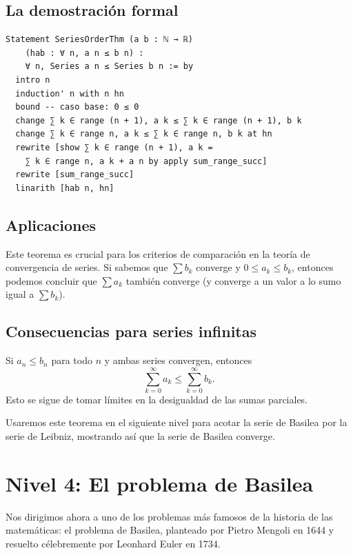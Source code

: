 \subsection{La demostración formal}

\begin{verbatim}
Statement SeriesOrderThm (a b : ℕ → ℝ)
    (hab : ∀ n, a n ≤ b n) :
    ∀ n, Series a n ≤ Series b n := by
  intro n
  induction' n with n hn
  bound -- caso base: 0 ≤ 0
  change ∑ k ∈ range (n + 1), a k ≤ ∑ k ∈ range (n + 1), b k
  change ∑ k ∈ range n, a k ≤ ∑ k ∈ range n, b k at hn
  rewrite [show ∑ k ∈ range (n + 1), a k =
    ∑ k ∈ range n, a k + a n by apply sum_range_succ]
  rewrite [sum_range_succ]
  linarith [hab n, hn]
\end{verbatim}

\subsection{Aplicaciones}

Este teorema es crucial para los criterios de comparación en la teoría de convergencia de series. Si sabemos que $\sum b_k$ converge y $0 \le a_k \le b_k$, entonces podemos concluir que $\sum a_k$ también converge (y converge a un valor a lo sumo igual a $\sum b_k$).

\subsection{Consecuencias para series infinitas}

Si $a_n \le b_n$ para todo $n$ y ambas series convergen, entonces
\[
  \sum_{k=0}^{\infty} a_k \le \sum_{k=0}^{\infty} b_k .
\]
Esto se sigue de tomar límites en la desigualdad de las sumas parciales.

\begin{ejemplo}
Usaremos este teorema en el siguiente nivel para acotar la serie de Basilea por la serie de Leibniz, mostrando así que la serie de Basilea converge.
\end{ejemplo}

\section{Nivel 4: El problema de Basilea}

Nos dirigimos ahora a uno de los problemas más famosos de la historia de las matemáticas: el problema de Basilea, planteado por Pietro Mengoli en 1644 y resuelto célebremente por Leonhard Euler en 1734.


